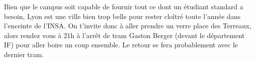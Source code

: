 Bien que le campus soit capable de fournir tout ce dont un étudiant standard a
besoin, Lyon est une ville bien trop belle pour rester cloîtré toute l'année dans
l'enceinte de l'INSA. On t'invite donc à aller prendre un verre place des
Terreaux, alors rendez vous à 21h à l'arrêt de tram Gaston Berger (devant le
département IF) pour aller boire un coup ensemble. Le retour se fera
probablement avec le dernier tram.
